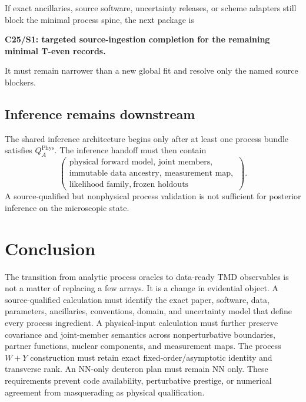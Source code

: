 \documentclass[11pt]{article}
\newcommand{\Phys}{\ensuremath{\mathrm{Phys}}}
\begin{document}
If exact ancillaries, source software, uncertainty releases, or scheme adapters still block the minimal process spine, the next package is
\begin{center}
\textbf{C25/S1: targeted source-ingestion completion for the remaining minimal T-even records.}
\end{center}
It must remain narrower than a new global fit and resolve only the named source blockers.

\subsection{Inference remains downstream}

The shared inference architecture begins only after at least one process bundle satisfies \(Q_A^{\Phys}\).  The inference handoff must then contain
\begin{equation}
 \left(
 \begin{gathered}
 \text{physical forward model},\ \text{joint members},\\
 \text{immutable data ancestry},\ \text{measurement map},\\
 \text{likelihood family},\ \text{frozen holdouts}
 \end{gathered}
 \right).
 \label{eq:inference-handoff}
\end{equation}
A source-qualified but nonphysical process validation is not sufficient for posterior inference on the microscopic state.

\section{Conclusion}
\label{sec:conclusion}

The transition from analytic process oracles to data-ready TMD observables is not a matter of replacing a few arrays.  It is a change in evidential object.  A source-qualified calculation must identify the exact paper, software, data, parameters, ancillaries, conventions, domain, and uncertainty model that define every process ingredient.  A physical-input calculation must further preserve covariance and joint-member semantics across nonperturbative boundaries, partner functions, nuclear components, and measurement maps.  The process \(W+Y\) construction must retain exact fixed-order/asymptotic identity and transverse rank.  An NN-only deuteron plan must remain NN only.  These requirements prevent code availability, perturbative prestige, or numerical agreement from masquerading as physical qualification.
\end{document}
